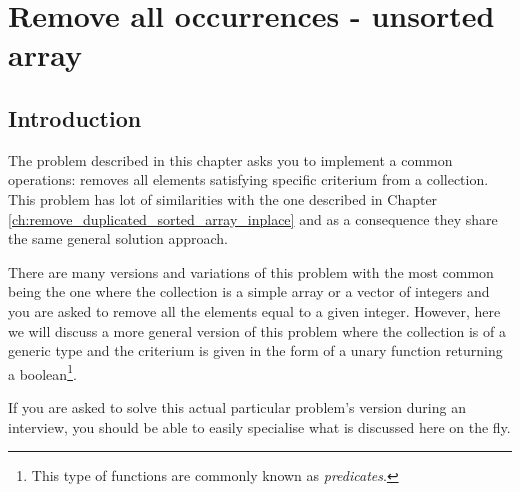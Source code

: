 %



\chapter{Remove all occurrences -  unsorted array}
\label{ch:remove_all_occurrences_unsorted_array_inplace}
\section*{Introduction}
The problem described in this chapter asks you to implement a common operations: removes all
elements satisfying specific criterium from a collection. This problem has lot of similarities with
the one described in Chapter \ref{ch:remove_duplicated_sorted_array_inplace} and as a consequence
they share the same general solution approach. 

There are many versions and variations of this problem with the most common being the one where the
collection is a simple array or a vector of integers and you are asked to remove all the elements
equal to a given integer. However, here we will discuss a more general version of this problem where
the collection is of a generic type  and the criterium is given in the form of a unary
function returning a boolean\footnote{This type of functions are commonly known as
\textit{predicates}.}. 

If you are asked to solve this actual particular problem’s version during an interview, you should be able to easily specialise what is discussed here on the fly.

